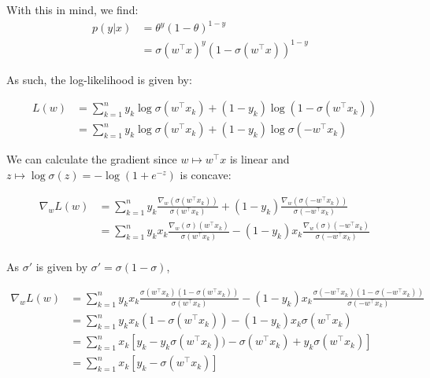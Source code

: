 \documentclass[a4paper, 11pt]{article}
\begin{document}
    With this in mind, we find:
    \begin{equation*}
        \begin{aligned}
        p \left( y|x \right) &= \theta^y(1-\theta)^{1-y} & \\
        &= \sigma \left( w^\top x \right)^y \left( 1-\sigma \left( w^\top x \right) \right)^{1-y}
        \end{aligned}
    \end{equation*}
    \vspace*{.6em}
    
    As such, the log-likelihood is given by:
    
    \begin{equation*}
        \begin{aligned}
        L \left( w \right) &= \sum_{k=1}^{n} y_k \log \sigma(w^\top x_k) + (1-y_k)\log(1 - \sigma(w^\top x_k)) \\
        &= \sum_{k=1}^{n} y_k \log \sigma(w^\top x_k) + (1-y_k)\log\sigma(-w^\top x_k)
        \end{aligned}
    \end{equation*}
    \vspace*{.6em}
    
    We can calculate the gradient since $w \mapsto w^\top x$ is linear and $z \mapsto \log \sigma(z) = - \log(1 + e^{-z}) $ is concave:
    
    \begin{equation*}
        \begin{aligned}
        \nabla_w L \left( w \right) &= \sum_{k=1}^{n} y_k \frac{ \nabla_w(\sigma(w^\top x_k)) }{\sigma(w^\top x_k)}  + (1-y_k)\frac{ \nabla_w(\sigma(-w^\top x_k)) }{\sigma(-w^\top x_k)} \\
        &= \sum_{k=1}^{n} y_k x_k \frac{ \nabla_w(\sigma)(w^\top x_k) }{\sigma(w^\top x_k)}  - (1-y_k)x_k \frac{ \nabla_w(\sigma)(-w^\top x_k) }{\sigma(-w^\top x_k)} \\
        \end{aligned}
    \end{equation*}
    \vspace*{.6em}
    
    As $\sigma'$ is given by $\sigma' = \sigma \left( 1 - \sigma \right)$,
    
    \begin{equation*}
        \begin{aligned}
        \nabla_w L \left( w \right) &= \sum_{k=1}^{n} y_k x_k \frac{ \sigma(w^\top x_k)(1 - \sigma(w^\top x_k)) }{\sigma(w^\top x_k)}  - (1-y_k)x_k \frac{ \sigma(-w^\top x_k)(1-\sigma(-w^\top x_k)) }{\sigma(-w^\top x_k)} \\
        &= \sum_{k=1}^{n} y_k x_k (1 - \sigma(w^\top x_k))  - (1-y_k)x_k \sigma(w^\top x_k) \\
        &= \sum_{k=1}^{n} x_k \left[y_k - y_k\sigma(w^\top x_k))  - \sigma(w^\top x_k) + y_k\sigma(w^\top x_k) \right]\\
        &= \sum_{k=1}^{n} x_k \left[y_k  - \sigma(w^\top x_k) \right]
        \end{aligned}
    \end{equation*}
    
\end{document}
